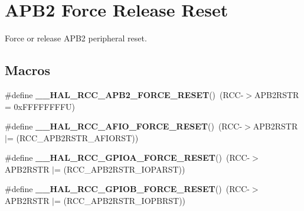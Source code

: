 \hypertarget{group___r_c_c___a_p_b2___force___release___reset}{}\section{A\+P\+B2 Force Release Reset}
\label{group___r_c_c___a_p_b2___force___release___reset}


Force or release A\+P\+B2 peripheral reset.  


\subsection*{Macros}
\begin{DoxyCompactItemize}
\item 
\mbox{\label{group___r_c_c___a_p_b2___force___release___reset_ga8788da8c644ad0cc54912baede7d49b4}} 
\#define {\bfseries \+\_\+\+\_\+\+H\+A\+L\+\_\+\+R\+C\+C\+\_\+\+A\+P\+B2\+\_\+\+F\+O\+R\+C\+E\+\_\+\+R\+E\+S\+ET}()~(R\+CC-\/$>$A\+P\+B2\+R\+S\+TR = 0x\+F\+F\+F\+F\+F\+F\+F\+F\+U)
\item 
\mbox{\label{group___r_c_c___a_p_b2___force___release___reset_gac1d0efbf1737e3528779cecbd0d80ebc}} 
\#define {\bfseries \+\_\+\+\_\+\+H\+A\+L\+\_\+\+R\+C\+C\+\_\+\+A\+F\+I\+O\+\_\+\+F\+O\+R\+C\+E\+\_\+\+R\+E\+S\+ET}()~(R\+CC-\/$>$A\+P\+B2\+R\+S\+TR $\vert$= (R\+C\+C\+\_\+\+A\+P\+B2\+R\+S\+T\+R\+\_\+\+A\+F\+I\+O\+R\+ST))
\item 
\mbox{\label{group___r_c_c___a_p_b2___force___release___reset_gab329bd497cccffd979bcca9fd42bbc79}} 
\#define {\bfseries \+\_\+\+\_\+\+H\+A\+L\+\_\+\+R\+C\+C\+\_\+\+G\+P\+I\+O\+A\+\_\+\+F\+O\+R\+C\+E\+\_\+\+R\+E\+S\+ET}()~(R\+CC-\/$>$A\+P\+B2\+R\+S\+TR $\vert$= (R\+C\+C\+\_\+\+A\+P\+B2\+R\+S\+T\+R\+\_\+\+I\+O\+P\+A\+R\+ST))
\item 
\mbox{\label{group___r_c_c___a_p_b2___force___release___reset_ga3b89be9638638ffce3ebd4f08a3b64cf}} 
\#define {\bfseries \+\_\+\+\_\+\+H\+A\+L\+\_\+\+R\+C\+C\+\_\+\+G\+P\+I\+O\+B\+\_\+\+F\+O\+R\+C\+E\+\_\+\+R\+E\+S\+ET}()~(R\+CC-\/$>$A\+P\+B2\+R\+S\+TR $\vert$= (R\+C\+C\+\_\+\+A\+P\+B2\+R\+S\+T\+R\+\_\+\+I\+O\+P\+B\+R\+ST))
\item 

\end{DoxyCompactItemize}
